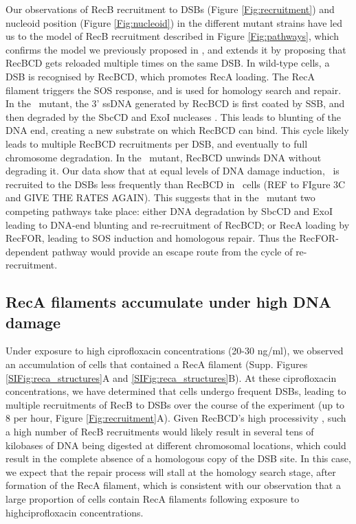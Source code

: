 Our observations of RecB recruitment to DSBs (Figure \ref{Fig:recruitment}) and nucleoid position (Figure \ref{Fig:nucleoid}) in the different mutant strains have led us to the model of RecB recruitment described in Figure \ref{Fig:pathways}, which confirms the model we previously proposed in \cite{Lepore2023}, and extends it by proposing that RecBCD gets reloaded multiple times on the same DSB. In wild-type cells, a DSB is recognised by RecBCD, which promotes RecA loading. The RecA filament triggers the SOS response, and is used for homology search and repair. In the \dreca\ mutant, the 3' ssDNA generated by RecBCD is first coated by SSB, and then degraded by the SbcCD and ExoI nucleases \cite{Zahradka2009}. This leads to blunting of the DNA end, creating a new substrate on which RecBCD can bind. This cycle likely leads to multiple RecBCD recruitments per DSB, and eventually to full chromosome degradation. In the \geneteneighty\ mutant, RecBCD unwinds DNA without degrading it. Our data show that at equal levels of DNA damage induction, \teneighty\ is recruited to the DSBs less frequently than RecBCD in \dreca\ cells (REF to FIgure 3C and GIVE THE RATES AGAIN). This suggests that in the \geneteneighty\ mutant two competing pathways take place: either DNA degradation by SbcCD and ExoI leading to DNA-end blunting and re-recruitment of RecBCD; or RecA loading by RecFOR, leading to SOS induction and homologous repair. Thus the RecFOR-dependent pathway would provide an escape route from the cycle of re-recruitment.

\subsection*{RecA filaments accumulate under high DNA damage}
Under exposure to high ciprofloxacin concentrations (20-30 ng/ml), we observed an accumulation of cells that contained a RecA filament (Supp. Figures \ref{SIFig:reca_structures}A and \ref{SIFig:reca_structures}B). At these ciprofloxacin concentrations, we have determined that cells undergo frequent DSBs, leading to multiple recruitments of RecB to DSBs over the course of the experiment (up to 8 per hour, Figure \ref{Fig:recruitment}A). Given RecBCD's high processivity \cite{Wiktor2018}, such a high number of RecB recruitments would likely result in several tens of kilobases of DNA being digested at different chromosomal locations, which could result in the complete absence of a homologous copy of the DSB site. In this case, we expect that the repair process will stall at the homology search stage, after formation of the RecA filament, which is consistent with our observation that a large proportion of cells contain RecA filaments following exposure to highciprofloxacin concentrations.

